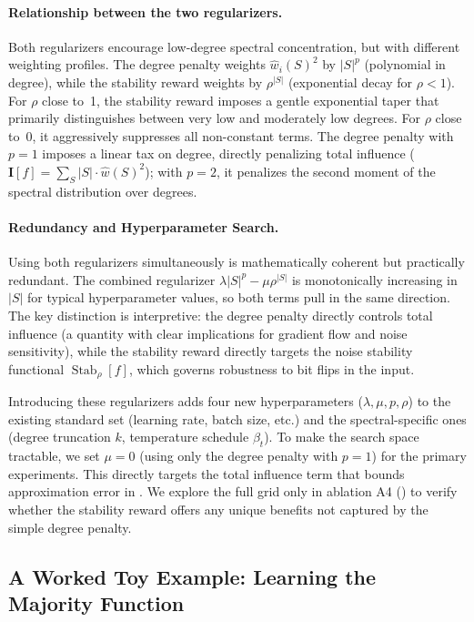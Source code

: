 \documentclass[12pt,a4paper]{article}
\theoremstyle{plain}
\theoremstyle{definition}
\theoremstyle{remark}
\newcommand{\what}{\widehat{w}}
\newcommand{\Stab}{\operatorname{Stab}}
\begin{document}
\paragraph{Relationship between the two regularizers.}
Both regularizers encourage low-degree spectral concentration, but with different weighting profiles.
The degree penalty weights $\what_i(S)^2$ by $|S|^p$ (polynomial in degree), while the stability reward weights by $\rho^{|S|}$ (exponential decay for $\rho < 1$).
For $\rho$ close to~1, the stability reward imposes a gentle exponential taper that primarily distinguishes between very low and moderately low degrees.
For $\rho$ close to~0, it aggressively suppresses all non-constant terms.
The degree penalty with $p = 1$ imposes a linear tax on degree, directly penalizing total influence ($\mathbf{I}[f] = \sum_S |S| \cdot \what(S)^2$); with $p = 2$, it penalizes the second moment of the spectral distribution over degrees.

\paragraph{Redundancy and Hyperparameter Search.}
Using both regularizers simultaneously is mathematically coherent but practically redundant. The combined regularizer $\lambda |S|^p - \mu \rho^{|S|}$ is monotonically increasing in $|S|$ for typical hyperparameter values, so both terms pull in the same direction.
The key distinction is interpretive: the degree penalty directly controls total influence (a quantity with clear implications for gradient flow and noise sensitivity), while the stability reward directly targets the noise stability functional $\Stab_\rho[f]$, which governs robustness to bit flips in the input.

Introducing these regularizers adds four new hyperparameters ($\lambda, \mu, p, \rho$) to the existing standard set (learning rate, batch size, etc.) and the spectral-specific ones (degree truncation $k$, temperature schedule $\beta_t$). To make the search space tractable, we set $\mu=0$ (using only the degree penalty with $p=1$) for the primary experiments. This directly targets the total influence term that bounds approximation error in . We explore the full grid only in ablation A4 () to verify whether the stability reward offers any unique benefits not captured by the simple degree penalty.


\subsection{A Worked Toy Example: Learning the Majority Function}\label{sec:toy-model}
\end{document}
